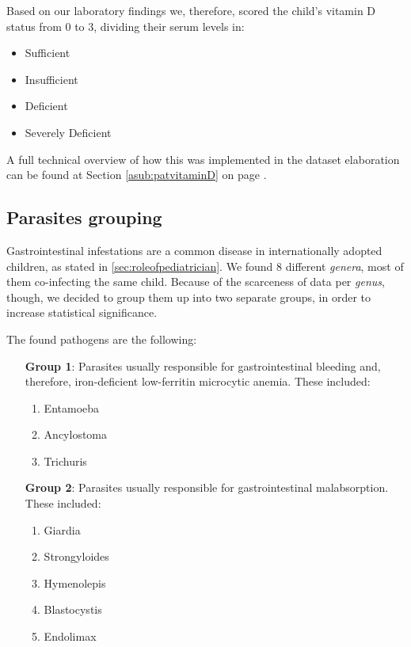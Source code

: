 Based on our laboratory findings we, therefore, scored the child's vitamin D status from 0 to 3, dividing their serum levels in:

\begin{itemize}
	\item Sufficient
	\item Insufficient
	\item Deficient
	\item Severely Deficient
\end{itemize}

A full technical overview of how this was implemented in the dataset elaboration can be found at Section \ref{asub:patvitaminD} on page \pageref{asub:patvitaminD}.

\subsection{Parasites grouping}\label{sub:parasites}
Gastrointestinal infestations are a common disease in internationally adopted children, as stated in \ref{sec:roleofpediatrician}. We found 8 different \textit{genera}, most of them co-infecting the same child. Because of the scarceness of data per \textit{genus}, though, we decided to group them up into two separate groups, in order to increase statistical significance.

The found pathogens are the following:

\begin{enumerate}[leftmargin=6em]
	\item [\textbf{Group 1}:] Parasites usually responsible for gastrointestinal bleeding and, therefore, iron-deficient low-ferritin microcytic anemia. These included:
		\begin{enumerate}[label=\alph*)]
			\item Entamoeba
			\item Ancylostoma
			\item Trichuris
		\end{enumerate}
	\item [\textbf{Group 2}:] Parasites usually responsible for gastrointestinal malabsorption. These included:
		\begin{enumerate}[label=\alph*)]
			\item Giardia
			\item Strongyloides
			\item Hymenolepis
			\item Blastocystis
			\item Endolimax
		\end{enumerate}
\end{enumerate}

